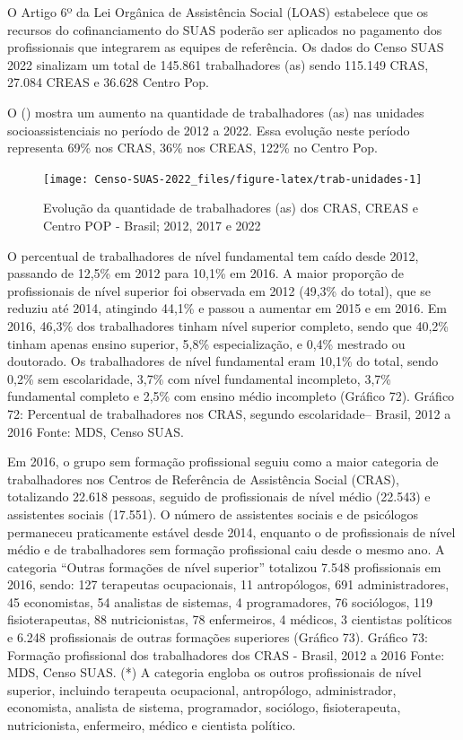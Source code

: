 \documentclass[
  brazilian]{report}
\begin{document}
O Artigo 6º da Lei Orgânica de Assistência Social (LOAS) estabelece que
os recursos do cofinanciamento do SUAS poderão ser aplicados no
pagamento dos profissionais que integrarem as equipes de referência. Os
dados do Censo SUAS 2022 sinalizam um total de 145.861 trabalhadores
(as) sendo 115.149 CRAS, 27.084 CREAS e 36.628 Centro Pop.

O () mostra um aumento na quantidade de
trabalhadores (as) nas unidades socioassistenciais no período de 2012 a
2022. Essa evolução neste período representa 69\% nos CRAS, 36\% nos
CREAS, 122\% no Centro Pop.

\begin{figure}
\texttt{[image: Censo-SUAS-2022\_files/figure-latex/trab-unidades-1]} \caption[ Evolução da quantidade de trabalhadores (as) dos CRAS, CREAS e Centro POP - Brasil]{ Evolução da quantidade de trabalhadores (as) dos CRAS, CREAS e Centro POP - Brasil; 2012, 2017 e 2022}\label{fig:trab-unidades}
\end{figure}

O percentual de trabalhadores de nível fundamental tem caído desde 2012,
passando de 12,5\% em 2012 para 10,1\% em 2016. A maior proporção de
profissionais de nível superior foi observada em 2012 (49,3\% do total),
que se reduziu até 2014, atingindo 44,1\% e passou a aumentar em 2015 e
em 2016. Em 2016, 46,3\% dos trabalhadores tinham nível superior
completo, sendo que 40,2\% tinham apenas ensino superior, 5,8\%
especialização, e 0,4\% mestrado ou doutorado. Os trabalhadores de nível
fundamental eram 10,1\% do total, sendo 0,2\% sem escolaridade, 3,7\%
com nível fundamental incompleto, 3,7\% fundamental completo e 2,5\% com
ensino médio incompleto (Gráfico 72). Gráfico 72: Percentual de
trabalhadores nos CRAS, segundo escolaridade-- Brasil, 2012 a 2016
Fonte: MDS, Censo SUAS.

Em 2016, o grupo sem formação profissional seguiu como a maior categoria
de trabalhadores nos Centros de Referência de Assistência Social (CRAS),
totalizando 22.618 pessoas, seguido de profissionais de nível médio
(22.543) e assistentes sociais (17.551). O número de assistentes sociais
e de psicólogos permaneceu praticamente estável desde 2014, enquanto o
de profissionais de nível médio e de trabalhadores sem formação
profissional caiu desde o mesmo ano. A categoria ``Outras formações de
nível superior'' totalizou 7.548 profissionais em 2016, sendo: 127
terapeutas ocupacionais, 11 antropólogos, 691 administradores, 45
economistas, 54 analistas de sistemas, 4 programadores, 76 sociólogos,
119 fisioterapeutas, 88 nutricionistas, 78 enfermeiros, 4 médicos, 3
cientistas políticos e 6.248 profissionais de outras formações
superiores (Gráfico 73). Gráfico 73: Formação profissional dos
trabalhadores dos CRAS - Brasil, 2012 a 2016 Fonte: MDS, Censo SUAS. (*)
A categoria engloba os outros profissionais de nível superior, incluindo
terapeuta ocupacional, antropólogo, administrador, economista, analista
de sistema, programador, sociólogo, fisioterapeuta, nutricionista,
enfermeiro, médico e cientista político.
\end{document}
